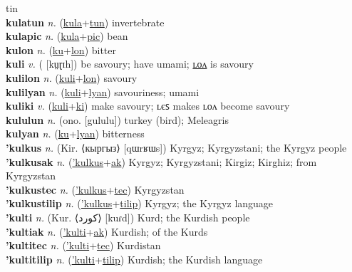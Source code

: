 tin \label{kulatatulon} \\
\textbf{kulatun} \textit{n.} (\hyperref[kula]{kula}+\hyperref[tun]{tun})
invertebrate \label{kulatun} \\
\textbf{kulapic} \textit{n.} (\hyperref[kula]{kula}+\hyperref[pic]{pic})
bean \label{kulapic} \\
\textbf{kulon} \textit{n.} (\hyperref[ku]{ku}+\hyperref[lon]{lon})
bitter \label{kulon} \\
\textbf{kuli} \textit{v.} ( [kṳɽɪh])
be savoury; have umami; \hyperref[kulilon]{ʟᴏᴧ} is savoury \label{kuli} \\
\textbf{kulilon} \textit{n.} (\hyperref[kuli]{kuli}+\hyperref[lon]{lon})
savoury \label{kulilon} \\
\textbf{kulilyan} \textit{n.} (\hyperref[kuli]{kuli}+\hyperref[lyan]{lyan})
savouriness; umami \label{kulilyan} \\
\textbf{kuliki} \textit{v.} (\hyperref[kuli]{kuli}+\hyperref[ki]{ki})
make savoury; ʟєꜱ makes ʟᴏᴧ become savoury \label{kuliki} \\
\textbf{kululun} \textit{n.} (ono. [gululu])
turkey (bird); Meleagris \label{kululun} \\
\textbf{kulyan} \textit{n.} (\hyperref[ku]{ku}+\hyperref[lyan]{lyan})
bitterness \label{kulyan} \\
\textbf{'kulkus} \textit{n.} (Kir. ⟨кыргыз⟩ [qɯrʁɯs])
Kyrgyz; Kyrgyzstani; the Kyrgyz people \label{'kulkus} \\
\textbf{'kulkusak} \textit{n.} (\hyperref['kulkus]{'kulkus}+\hyperref[ak]{ak})
Kyrgyz; Kyrgyzstani; Kirgiz; Kirghiz; from Kyrgyzstan \label{'kulkusak} \\
\textbf{'kulkustec} \textit{n.} (\hyperref['kulkus]{'kulkus}+\hyperref[tec]{tec})
Kyrgyzstan \label{'kulkustec} \\
\textbf{'kulkustilip} \textit{n.} (\hyperref['kulkus]{'kulkus}+\hyperref[tilip]{tilip})
Kyrgyz; the Kyrgyz language \label{'kulkustilip} \\
\textbf{'kulti} \textit{n.} (Kur. ⟨کورد‎⟩ [kuɾd])
Kurd; the Kurdish people \label{'kulti} \\
\textbf{'kultiak} \textit{n.} (\hyperref['kulti]{'kulti}+\hyperref[ak]{ak})
Kurdish; of the Kurds \label{'kultiak} \\
\textbf{'kultitec} \textit{n.} (\hyperref['kulti]{'kulti}+\hyperref[tec]{tec})
Kurdistan \label{'kultitec} \\
\textbf{'kultitilip} \textit{n.} (\hyperref['kulti]{'kulti}+\hyperref[tilip]{tilip})
Kurdish; the Kurdish language \label{'kultitilip} \\
